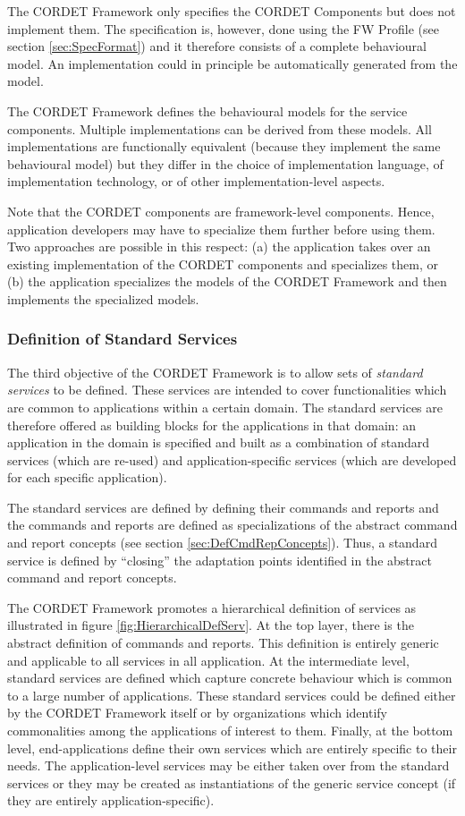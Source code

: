 \documentclass{pnp_article}
\begin{document}
The CORDET Framework only specifies the CORDET Components but does not implement them. 
The specification is, however, done using the FW Profile (see section \ref{sec:SpecFormat}) and it therefore consists of a complete behavioural model. 
An implementation could in principle be automatically generated from the model. 

The CORDET Framework defines the behavioural models for the service components. 
Multiple implementations can be derived from these models. 
All implementations are functionally equivalent (because they implement the same behavioural model) but they differ in the choice of implementation language, of implementation technology, or of other implementation-level aspects. 

Note that the CORDET components are framework-level components. 
Hence, application developers may have to specialize them further before using them. 
Two approaches are possible in this respect: (a) the application takes over an existing implementation of the CORDET components and specializes them, or (b) the application specializes the models of the CORDET Framework and then implements the specialized models.

\subsubsection{Definition of Standard Services}\label{sec:StdServ}
The third objective of the CORDET Framework is to allow sets of \textit{standard services} to be defined. 
These services are intended to cover functionalities which are common to applications within a certain domain. 
The standard services are therefore offered as building blocks for the applications in that domain: 
an application in the domain is specified and built as a combination of standard services (which are re-used) and application-specific services (which are developed for each specific application).

The standard services are defined by defining their commands and reports and the commands and reports are defined as specializations of the abstract command and report concepts (see section \ref{sec:DefCmdRepConcepts}). 
Thus, a standard service is defined by “closing” the adaptation points identified in the abstract command and report concepts.

The CORDET Framework promotes a hierarchical definition of services as illustrated in figure \ref{fig:HierarchicalDefServ}. 
At the top layer, there is the abstract definition of commands and reports. 
This definition is entirely generic and applicable to all services in all application. 
At the intermediate level, standard services are defined which capture concrete behaviour which is common to a large number of applications. 
These standard services could be defined either by the CORDET Framework itself or by organizations which identify commonalities among the applications of interest to them. 
Finally, at the bottom level, end-applications define their own services which are entirely specific to their needs. 
The application-level services may be either taken over from the standard services or they may be created as instantiations of the generic service concept (if they are entirely application-specific).
\end{document}
